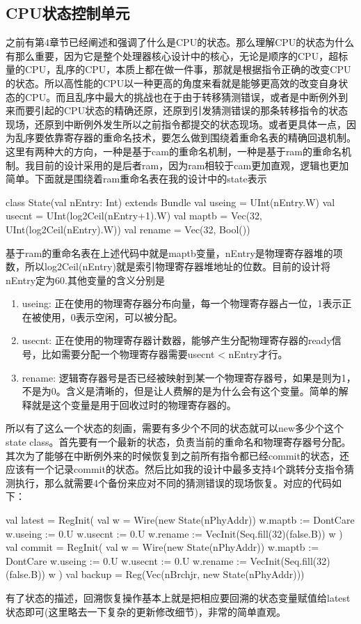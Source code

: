 \documentclass[11pt]{article}
\begin{document}
\subsection{CPU状态控制单元}
之前有第4章节已经阐述和强调了什么是CPU的状态。那么理解CPU的状态为什么有那么重要，因为它是整个处理器核心设计中的核心，无论是顺序的CPU，超标量的CPU，乱序的CPU，本质上都在做一件事，那就是根据指令正确的改变CPU的状态。所以高性能的CPU以一种更高的角度来看就是能够更高效的改变自身状态的CPU。而且乱序中最大的挑战也在于由于转移猜测错误，或者是中断例外到来而要引起的CPU状态的精确还原，还原到引发猜测错误的那条转移指令的状态现场，还原到中断例外发生所以之前指令都提交的状态现场。或者更具体一点，因为乱序要依靠寄存器的重命名技术，要怎么做到围绕着重命名表的精确回退机制。这里有两种大的方向，一种是基于cam的重命名机制，一种是基于ram的重命名机制。我目前的设计采用的是后者ram，因为ram相较于cam更加直观，逻辑也更加简单。下面就是围绕着ram重命名表在我的设计中的state表示
\begin{scala}
	class State(val nEntry: Int) extends Bundle {
		val useing = UInt(nEntry.W)
		val usecnt = UInt(log2Ceil(nEntry+1).W)
		val maptb  = Vec(32, UInt(log2Ceil(nEntry).W))
		val rename = Vec(32, Bool())
	}
\end{scala}	
基于ram的重命名表在上述代码中就是maptb变量，nEntry是物理寄存器堆的项数，所以log2Ceil(nEntry)就是索引物理寄存器堆地址的位数。目前的设计将nEntry定为60.其他变量的含义分别是
\begin{enumerate}
	\item useing: 正在使用的物理寄存器分布向量，每一个物理寄存器占一位，1表示正在被使用，0表示空闲，可以被分配。
	\item usecnt: 正在使用的物理寄存器计数器，能够产生分配物理寄存器的ready信号，比如需要分配一个物理寄存器需要usecnt < nEntry才行。
	\item rename: 逻辑寄存器号是否已经被映射到某一个物理寄存器号，如果是则为1，不是为0。含义是清晰的，但是让人费解的是为什么会有这个变量。简单的解释就是这个变量是用于回收过时的物理寄存器的。
\end{enumerate}
所以有了这么一个状态的刻画，需要有多少个不同的状态就可以new多少个这个state class。首先要有一个最新的状态，负责当前的重命名和物理寄存器号分配。其次为了能够在中断例外来的时候恢复到之前所有指令都已经commit的状态，还应该有一个记录commit的状态。然后比如我的设计中最多支持4个跳转分支指令猜测执行，那么就需要4个备份来应对不同的猜测错误的现场恢复。对应的代码如下：
\begin{scala}
	val latest = RegInit({
		val w = Wire(new State(nPhyAddr))
		w.maptb  := DontCare
		w.useing := 0.U
		w.usecnt := 0.U
		w.rename := VecInit(Seq.fill(32)(false.B))
		w
	})
	val commit = RegInit({
		val w = Wire(new State(nPhyAddr))
		w.maptb  := DontCare
		w.useing := 0.U
		w.usecnt := 0.U
		w.rename := VecInit(Seq.fill(32)(false.B))
		w
	})
	val backup = Reg(Vec(nBrchjr, new State(nPhyAddr)))
\end{scala}	
有了状态的描述，回溯恢复操作基本上就是把相应要回溯的状态变量赋值给latest状态即可(这里略去一下复杂的更新修改细节)，非常的简单直观。
\end{document}
